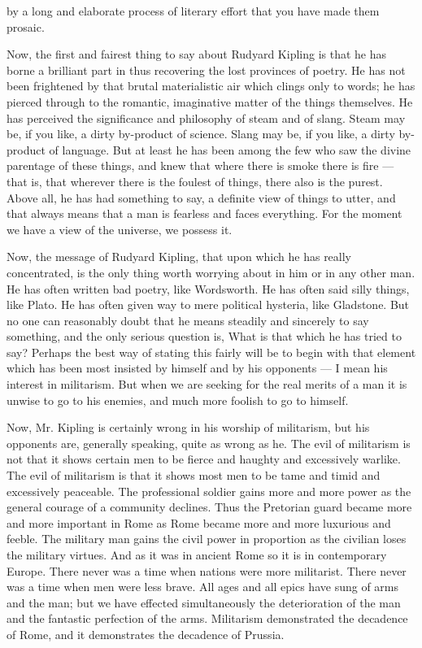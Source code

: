 by a long and elaborate process of literary effort that you have made them prosaic.

Now, the first and fairest thing to say about Rudyard Kipling is that he has borne a brilliant part in thus recovering the lost provinces of poetry. He has not been frightened by that brutal materialistic air which clings only to words; he has pierced through to the romantic, imaginative matter of the things themselves. He has perceived the significance and philosophy of steam and of slang. Steam may be, if you like, a dirty by-product of science. Slang may be, if you like, a dirty by-product of language. But at least he has been among the few who saw the divine parentage of these things, and knew that where there is smoke there is fire — that is, that wherever there is the foulest of things, there also is the purest. Above all, he has had something to say, a definite view of things to utter, and that always means that a man is fearless and faces everything. For the moment we have a view of the universe, we possess it.

Now, the message of Rudyard Kipling, that upon which he has really concentrated, is the only thing worth worrying about in him or in any other man. He has often written bad poetry, like Wordsworth. He has often said silly things, like Plato. He has often given way to mere political hysteria, like Gladstone. But no one can reasonably doubt that he means steadily and sincerely to say something, and the only serious question is, What is that which he has tried to say? Perhaps the best way of stating this fairly will be to begin with that element which has been most insisted by himself and by his opponents — I mean his interest in militarism. But when we are seeking for the real merits of a man it is unwise to go to his enemies, and much more foolish to go to himself.

Now, Mr. Kipling is certainly wrong in his worship of militarism, but his opponents are, generally speaking, quite as wrong as he. The evil of militarism is not that it shows certain men to be fierce and haughty and excessively warlike. The evil of militarism is that it shows most men to be tame and timid and excessively peaceable. The professional soldier gains more and more power as the general courage of a community declines. Thus the Pretorian guard became more and more important in Rome as Rome became more and more luxurious and feeble. The military man gains the civil power in proportion as the civilian loses the military virtues. And as it was in ancient Rome so it is in contemporary Europe. There never was a time when nations were more militarist. There never was a time when men were less brave. All ages and all epics have sung of arms and the man; but we have effected simultaneously the deterioration of the man and the fantastic perfection of the arms. Militarism demonstrated the decadence of Rome, and it demonstrates the decadence of Prussia.

